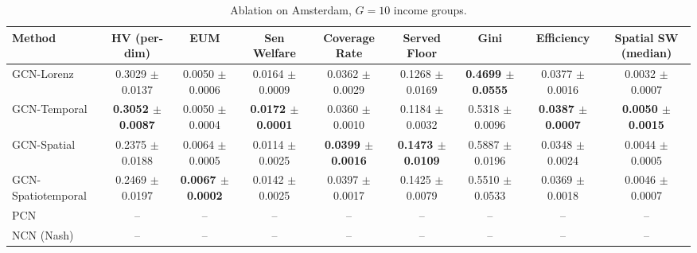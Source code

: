 \begin{table}[htbp]
\centering
\caption{Ablation on Amsterdam, $G=10$ income groups.}
\label{tab:ablation_amsterdam_g10}
\begin{tabular}{lcccccccc}
\toprule
Method & HV (per-dim) & EUM & Sen Welfare & Coverage Rate & Served Floor & Gini & Efficiency & Spatial SW (median) \\
\midrule
GCN-Lorenz & 0.3029 $\pm$ 0.0137 & 0.0050 $\pm$ 0.0006 & 0.0164 $\pm$ 0.0009 & 0.0362 $\pm$ 0.0029 & 0.1268 $\pm$ 0.0169 & \textbf{0.4699 $\pm$ 0.0555} & 0.0377 $\pm$ 0.0016 & 0.0032 $\pm$ 0.0007 \\
GCN-Temporal & \textbf{0.3052 $\pm$ 0.0087} & 0.0050 $\pm$ 0.0004 & \textbf{0.0172 $\pm$ 0.0001} & 0.0360 $\pm$ 0.0010 & 0.1184 $\pm$ 0.0032 & 0.5318 $\pm$ 0.0096 & \textbf{0.0387 $\pm$ 0.0007} & \textbf{0.0050 $\pm$ 0.0015} \\
GCN-Spatial & 0.2375 $\pm$ 0.0188 & 0.0064 $\pm$ 0.0005 & 0.0114 $\pm$ 0.0025 & \textbf{0.0399 $\pm$ 0.0016} & \textbf{0.1473 $\pm$ 0.0109} & 0.5887 $\pm$ 0.0196 & 0.0348 $\pm$ 0.0024 & 0.0044 $\pm$ 0.0005 \\
GCN-Spatiotemporal & 0.2469 $\pm$ 0.0197 & \textbf{0.0067 $\pm$ 0.0002} & 0.0142 $\pm$ 0.0025 & 0.0397 $\pm$ 0.0017 & 0.1425 $\pm$ 0.0079 & 0.5510 $\pm$ 0.0533 & 0.0369 $\pm$ 0.0018 & 0.0046 $\pm$ 0.0007 \\
PCN & -- & -- & -- & -- & -- & -- & -- & -- \\
NCN (Nash) & -- & -- & -- & -- & -- & -- & -- & -- \\
\bottomrule
\end{tabular}
\end{table}
